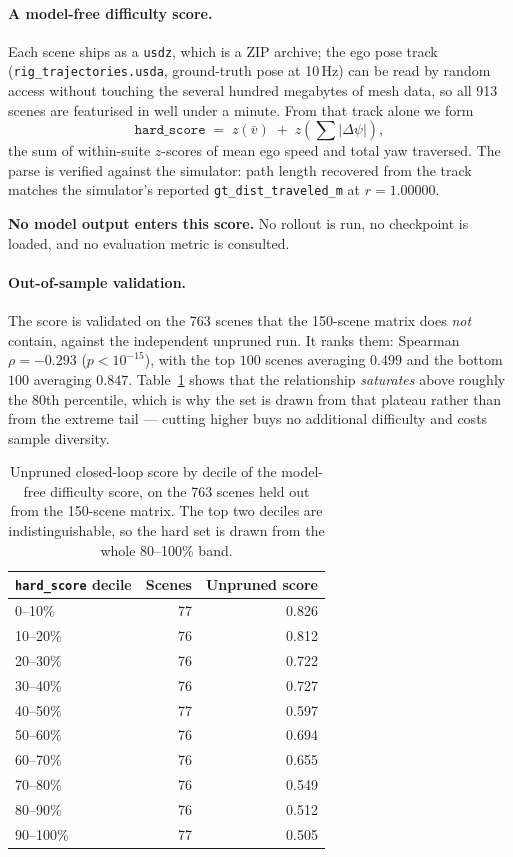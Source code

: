 \paragraph{A model-free difficulty score.}
Each scene ships as a \texttt{usdz}, which is a ZIP archive; the ego pose track
(\texttt{rig\_trajectories.usda}, ground-truth pose at 10\,Hz) can be read by random
access without touching the several hundred megabytes of mesh data, so all 913
scenes are featurised in well under a minute. From that track alone we form
\[
  \texttt{hard\_score} \;=\; z(\bar v) \;+\; z(\textstyle\sum |\Delta\psi|),
\]
the sum of within-suite $z$-scores of mean ego speed and total yaw traversed. The parse is
verified against the simulator: path length recovered from the track matches the
simulator's reported \texttt{gt\_dist\_traveled\_m} at $r = 1.00000$.

\textbf{No model output enters this score.} No rollout is run, no checkpoint is loaded,
and no evaluation metric is consulted.

\paragraph{Out-of-sample validation.}
The score is validated on the 763 scenes that the 150-scene matrix does
\emph{not} contain, against the independent unpruned run. It ranks them:
Spearman $\rho = -0.293$ ($p<10^{-15}$), with the top
$100$ scenes averaging $0.499$ and the bottom $100$ averaging $0.847$.
Table~\ref{tab:hard100-deciles} shows that the relationship \emph{saturates} above
roughly the 80th percentile, which is why the set is drawn from that plateau rather than
from the extreme tail --- cutting higher buys no additional difficulty and costs sample
diversity.

\begin{table}[t]
\centering\small
\caption{Unpruned closed-loop score by decile of the model-free difficulty score, on the
  763 scenes held out from the 150-scene matrix. The top two deciles are
  indistinguishable, so the hard set is drawn from the whole 80--100\% band.}
\label{tab:hard100-deciles}
\begin{tabular}{lrr}
\toprule
\texttt{hard\_score} decile & Scenes & Unpruned score \\
\midrule
    0--10\% & 77 & 0.826 \\
    10--20\% & 76 & 0.812 \\
    20--30\% & 76 & 0.722 \\
    30--40\% & 76 & 0.727 \\
    40--50\% & 77 & 0.597 \\
    50--60\% & 76 & 0.694 \\
    60--70\% & 76 & 0.655 \\
    70--80\% & 76 & 0.549 \\
    80--90\% & 76 & 0.512 \\
    90--100\% & 77 & 0.505 \\
\bottomrule
\end{tabular}
\end{table}

